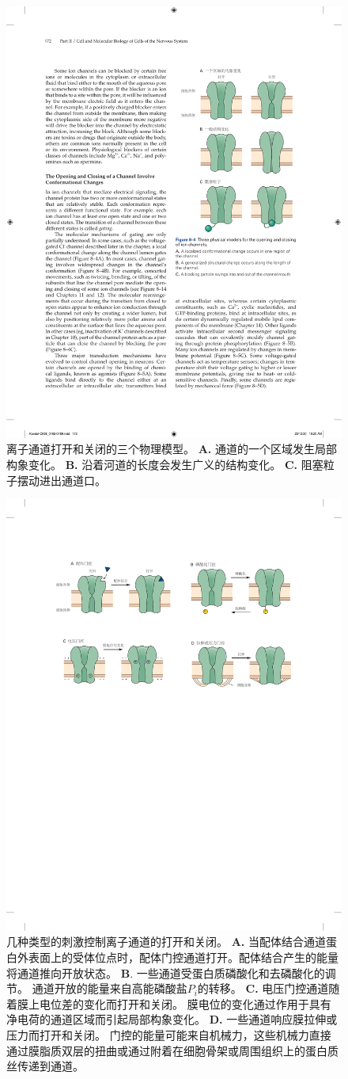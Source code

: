 \begin{figure}[htbp]
	\centering
	\includegraphics[width=0.5\linewidth]{chap08/fig_8_4}
	\caption{离子通道打开和关闭的三个物理模型。
		\textbf{A.} 通道的一个区域发生局部构象变化。
		\textbf{B.} 沿着河道的长度会发生广义的结构变化。
		\textbf{C.} 阻塞粒子摆动进出通道口。}
	\label{fig:8_4}
\end{figure}


\begin{figure}[htbp]
	\centering
	\includegraphics[width=0.85\linewidth]{chap08/fig_8_5}
	\caption{几种类型的刺激控制离子通道的打开和关闭。
		\textbf{A.} 当配体结合通道蛋白外表面上的受体位点时，配体门控通道打开。配体结合产生的能量将通道推向开放状态。
		\textbf{B}. 一些通道受蛋白质磷酸化和去磷酸化的调节。
		通道开放的能量来自高能磷酸盐$P_i$的转移。
		\textbf{C.} 电压门控通道随着膜上电位差的变化而打开和关闭。
		膜电位的变化通过作用于具有净电荷的通道区域而引起局部构象变化。
		\textbf{D.} 一些通道响应膜拉伸或压力而打开和关闭。
		门控的能量可能来自机械力，这些机械力直接通过膜脂质双层的扭曲或通过附着在细胞骨架或周围组织上的蛋白质丝传递到通道。}
	\label{fig:8_5}
\end{figure}


